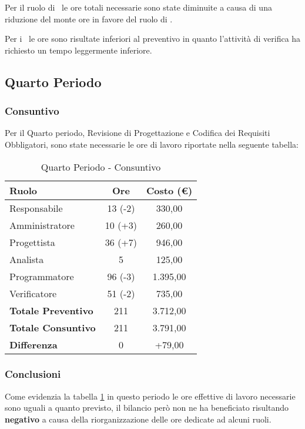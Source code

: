 \documentclass[../PianoDiProgetto_v4.0.0.tex]{subfiles}
\begin{document}
			Per il ruolo di \analista\ le ore totali necessarie sono state diminuite a causa di una riduzione del monte ore in favore del ruolo di \progettista.
			
			Per i \verificatori\ le ore sono risultate inferiori al preventivo in quanto l'attività di verifica ha richiesto un tempo leggermente inferiore. 

	\subsection{Quarto Periodo}
		\subsubsection{Consuntivo}
		Per il Quarto periodo, Revisione di Progettazione e Codifica dei Requisiti Obbligatori, sono state necessarie le ore di lavoro riportate nella seguente tabella:
		
		\begin{table}[h]
				\centering
				\begin{tabular}{l * {2}{c}}
					\toprule
					\textbf{Ruolo} & \textbf{Ore} & \textbf{Costo (\euro{})} \\
					\midrule
					Responsabile & 13 (-2) & 330,00 \\

					Amministratore & 10 (+3) & 260,00 \\

					Progettista & 36 (+7) & 946,00 \\

					Analista & 5 & 125,00 \\		

					Programmatore & 96 (-3) & 1.395,00 \\		

					Verificatore & 51 (-2) & 735,00 \\				
					\midrule		
					\textbf{Totale Preventivo} & 211 & 3.712,00 \\
					\textbf{Totale Consuntivo} & 211  & 3.791,00 \\
					\midrule
					\textbf{Differenza} & 0  & +79,00 \\
					\bottomrule
				\end{tabular}
				\caption{Quarto Periodo - Consuntivo}
				\label{tab:consuntivo4}	
			\end{table}
		
		\subsubsection{Conclusioni}
		Come evidenzia la tabella \ref{tab:consuntivo4} in questo periodo le ore effettive di lavoro necessarie sono uguali a quanto previsto, il bilancio però non ne ha beneficiato risultando \textbf{negativo} a causa della riorganizzazione delle ore dedicate ad alcuni ruoli.
		
\end{document}
